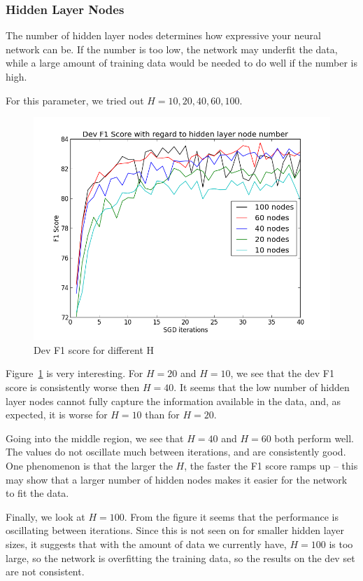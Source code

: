 \documentclass[12pt, twocolumn]{article}
\begin{document}
\subsubsection{Hidden Layer Nodes}
The number of hidden layer nodes determines how expressive your neural network can be. If the number is too low, the network may underfit the data, while a large amount of training data would be needed to do well if the number is high.

For this parameter, we tried out $H=10,20,40,60,100$.
\begin{figure}[H]
\centering
\includegraphics[width = \linewidth]{plots/hidden}
\caption{Dev F1 score for different H}
\label{fig:hidden}
\end{figure}
Figure~\ref{fig:hidden} is very interesting. For $H=20$ and $H=10$, we see that the dev F1 score is consistently worse then $H=40$. It seems that the low number of hidden layer nodes cannot fully capture the information available in the data, and, as expected, it is worse for $H=10$ than for $H=20$.

Going into the middle region, we see that $H=40$ and $H=60$ both perform well. The values do not oscillate much between iterations, and are consistently good. One phenomenon is that the larger the $H$, the faster the F1 score ramps up -- this may show that a larger number of hidden nodes makes it easier for the network to fit the data.

Finally, we look at $H=100$. From the figure it seems that the performance is oscillating between iterations. Since this is not seen on for smaller hidden layer sizes, it suggests that with the amount of data we currently have, $H=100$ is too large, so the network is overfitting the training data, so the results on the dev set are not consistent.
\end{document}
